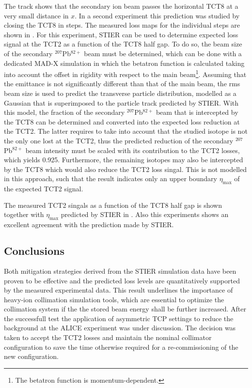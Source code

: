 The track shows that the secondary ion beam passes the horizontal TCT8 at a very small distance in $x$. In a second experiment this prediction was studied by closing the TCT8 in steps. The measured loss maps for the individual steps are shown in . For this experiment, STIER can be used to determine expected loss signal at the TCT2 as a function of the TCT8 half gap. To do so, the beam size of the secondary $^{207}$Pb$^{82+}$ beam must be determined, which can be done with a dedicated MAD-X simulation in which the betatron function is calculated taking into account the offset in rigidity with respect to the main beam\footnote{The betatron function is momentum-dependent.}. Assuming that the emittance is not significantly different than that of the main beam, the rms beam size is used to predict the transverse particle distribution, modelled as a Gaussian that is superimposed to the particle track predicted by STIER. With this model, the fraction of the secondary $^{207}$Pb$^{82+}$ beam that is intercepted by the TCT8 can be determined and converted into the expected loss reduction at the TCT2. The latter requires to take into account that the studied isotope is not the only one lost at the TCT2, thus the predicted reduction of the  secondary $^{207}$Pb$^{82+}$ beam intensity must be scaled with its contribution to the TCT2 losses, which yields 0.925. Furthermore, the remaining isotopes may also be intercepted by the TCT8 which would also reduce the TCT2 loss singal. This is not modelled in this approach, such that the result indicates only an upper boundary $\eta_\text{max}$ of the expected TCT2 signal. 


The measured TCT2 singals as a function of the TCT8 half gap is shown together with $\eta_\text{max}$ predicted by STIER in . Also this experiments shows an excellent agreement with the prediction made by STIER. 

\subsection{Conclusions}

Both mitigation strategies derived from the STIER simulation data have been proven to be effective and the predicted loss levels are quantitatively supported by the measured experimental data. This result underlines the importance of heavy-ion collimation simulation tools, which are essential to optimize the collimation system if the the stored beam energy shall be further increased. After the successfull test the application of asymmetric TCP settings to reduce the background at the ALICE experiment was under discussion. The decision was taken to accept the TCT2 losses and maintain the nominal collimator configuration to save the time otherwise required for a re-commissioning of the new configuration. 



